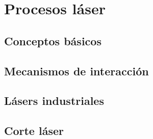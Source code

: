 \chapter{Procesos láser}

\section{Conceptos básicos}

\section{Mecanismos de interacción}

\section{Lásers industriales}

\section{Corte láser}